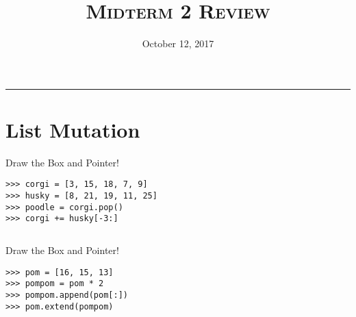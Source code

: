 \documentclass{exam}
\title{\textsc{Midterm 2 Review}}
\date{October 12, 2017}
\begin{document}
\maketitle
\rule{\textwidth}{0.15em}
\fontsize{12}{15}\selectfont




\section{List Mutation}
\begin{questions}

\item Draw the Box and Pointer!
\newline
\begin{lstlisting}
>>> corgi = [3, 15, 18, 7, 9]
>>> husky = [8, 21, 19, 11, 25]
>>> poodle = corgi.pop()
>>> corgi += husky[-3:]
\end{lstlisting}
\begin{solution}
\begin{lstlisting}

\end{lstlisting}
\end{solution}
\vspace{4cm}

\item Draw the Box and Pointer!

\begin{lstlisting}
>>> pom = [16, 15, 13]
>>> pompom = pom * 2
>>> pompom.append(pom[:])
>>> pom.extend(pompom)
\end{lstlisting}

\end{questions}
\clearpage
\end{document}
